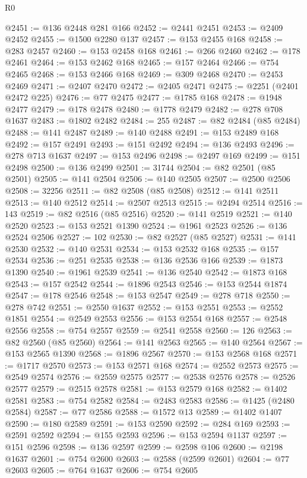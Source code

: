 \begin{lexlean}{R0}
\begin{coremodule}
@2451 := @136 @2448 @281 @166
@2452 := @2441 @2451
@2453 := @2409 @2452
@2455 := @1500 @2280 @137
@2457 := @153 @2455 @168
@2458 := @283 @2457
@2460 := @153 @2458 @168
@2461 := @266 @2460
@2462 := @178 @2461
@2464 := @153 @2462 @168
@2465 := @157 @2464
@2466 := @754 @2465
@2468 := @153 @2466 @168
@2469 := @309 @2468
@2470 := @2453 @2469
@2471 := @2407 @2470
@2472 := @2405 @2471
@2475 := @2251 (@2401 @2472 @225)
@2476 := @77 @2475
@2477 := @1785 @168
@2478 := @1948 @2477
@2479 := @178 @2478
@2480 := @1778 @2479
@2482 := @278 @708 @1637
@2483 := @1802 @2482
@2484 := 255
@2487 := @82 @2484 (@85 @2484)
@2488 := @141 @2487
@2489 := @140 @2488
@2491 := @153 @2489 @168
@2492 := @157 @2491
@2493 := @151 @2492
@2494 := @136 @2493
@2496 := @278 @713 @1637
@2497 := @153 @2496
@2498 := @2497 @169
@2499 := @151 @2498
@2500 := @136 @2499
@2501 := 31744
@2504 := @82 @2501 (@85 @2501)
@2505 := @141 @2504
@2506 := @140 @2505
@2507 := @2500 @2506
@2508 := 32256
@2511 := @82 @2508 (@85 @2508)
@2512 := @141 @2511
@2513 := @140 @2512
@2514 := @2507 @2513
@2515 := @2494 @2514
@2516 := 143
@2519 := @82 @2516 (@85 @2516)
@2520 := @141 @2519
@2521 := @140 @2520
@2523 := @153 @2521 @1390
@2524 := @1961 @2523
@2526 := @136 @2524 @2506
@2527 := 102
@2530 := @82 @2527 (@85 @2527)
@2531 := @141 @2530
@2532 := @140 @2531
@2534 := @153 @2532 @168
@2535 := @157 @2534
@2536 := @251 @2535
@2538 := @136 @2536 @166
@2539 := @1873 @1390
@2540 := @1961 @2539
@2541 := @136 @2540
@2542 := @1873 @168
@2543 := @157 @2542
@2544 := @1896 @2543
@2546 := @153 @2544 @1874
@2547 := @178 @2546
@2548 := @153 @2547
@2549 := @278 @718
@2550 := @278 @742
@2551 := @2550 @1637
@2552 := @153 @2551
@2553 := @2552 @1851
@2554 := @2549 @2553
@2556 := @153 @2554 @168
@2557 := @2548 @2556
@2558 := @754 @2557
@2559 := @2541 @2558
@2560 := 126
@2563 := @82 @2560 (@85 @2560)
@2564 := @141 @2563
@2565 := @140 @2564
@2567 := @153 @2565 @1390
@2568 := @1896 @2567
@2570 := @153 @2568 @168
@2571 := @1717 @2570
@2573 := @153 @2571 @168
@2574 := @2552 @2573
@2575 := @2549 @2574
@2576 := @2559 @2575
@2577 := @2538 @2576
@2578 := @2526 @2577
@2579 := @2515 @2578
@2581 := @153 @2579 @168
@2582 := @1402 @2581
@2583 := @754 @2582
@2584 := @2483 @2583
@2586 := @1425 (@2480 @2584)
@2587 := @77 @2586
@2588 := @1572 @13
@2589 := @1402 @1407
@2590 := @180 @2589
@2591 := @153 @2590
@2592 := @284 @169
@2593 := @2591 @2592
@2594 := @155 @2593
@2596 := @153 @2594 @1137
@2597 := @151 @2596
@2598 := @136 @2597
@2599 := @2598 @106
@2600 := @2198 @1637
@2601 := @754 @2600
@2603 := @2588 (@2599 @2601)
@2604 := @77 @2603
@2605 := @764 @1637
@2606 := @754 @2605

\end{coremodule}
\end{lexlean}
